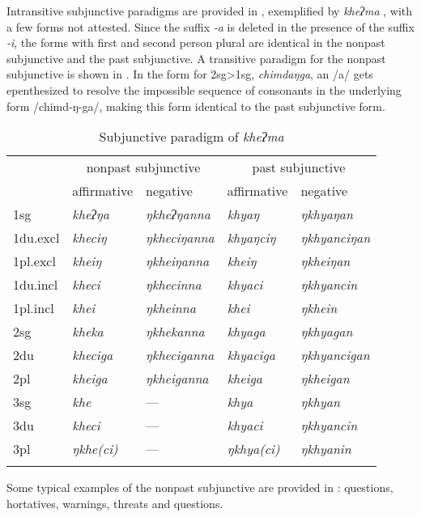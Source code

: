 Intransitive  subjunctive paradigms are provided in , exemplified by \emph{kheʔma} ,  with a few forms not attested. Since the suffix \emph{-a} is deleted in the presence of the suffix \emph{-i}, the forms with first and second person plural are identical in the nonpast subjunctive and the past subjunctive. A transitive paradigm for the nonpast subjunctive is shown in .  In the  form for {\sc 2sg>1sg}, \emph{chimdaŋga}, an /a/ gets epenthesized to resolve the impossible sequence of consonants in the underlying form /chimd-ŋ-ga/, making this form  identical to  the past subjunctive form.

\begin{table}[t]
\begin{tabular}{lllll}
\lsptoprule
&\multicolumn{2}{c}{{\sc nonpast subjunctive}}&\multicolumn{2}{c}{{\sc past subjunctive}}\\
		&{\sc affirmative} & {\sc negative} & {\sc affirmative} & {\sc negative}  \\
\midrule
		{\sc 1sg}& \it kheʔŋa& \it ŋkheʔŋanna& \it khyaŋ& \it ŋkhyaŋan \\
		{\sc 1du.excl}& \it kheciŋ& \it ŋkheciŋanna& \it khyaŋciŋ& \it ŋkhyanciŋan \\
		{\sc 1pl.excl}& \it kheiŋ& \it ŋkheiŋanna& \it kheiŋ& \it ŋkheiŋan \\
		{\sc 1du.incl}& \it kheci& \it ŋkhecinna& \it khyaci& \it ŋkhyancin \\
		{\sc1pl.incl}& \it khei& \it ŋkheinna& \it khei& \it ŋkhein \\
\midrule
		{\sc 2sg}& \it kheka& \it ŋkhekanna& \it khyaga& \it ŋkhyagan \\
		{\sc 2du}& \it kheciga& \it ŋkheciganna& \it khyaciga& \it ŋkhyancigan \\
		{\sc2pl}& \it kheiga& \it ŋkheiganna& \it kheiga& \it ŋkheigan \\
\midrule
		{\sc 3sg}& \it khe& — & \it khya& \it ŋkhyan \\
		{\sc 3du}& \it kheci&   — & \it khyaci& \it ŋkhyancin \\
		{\sc 3pl}& \it ŋkhe(ci)&   — & \it ŋkhya(ci)& \it ŋkhyanin \\
\lspbottomrule	
\end{tabular}
\caption{Subjunctive paradigm of \emph{kheʔma} }\label{par-sbjv-intr}
\end{table}


  Some typical examples of the nonpast subjunctive are provided in \Next: questions, hortatives, warnings,  threats and  questions.   

